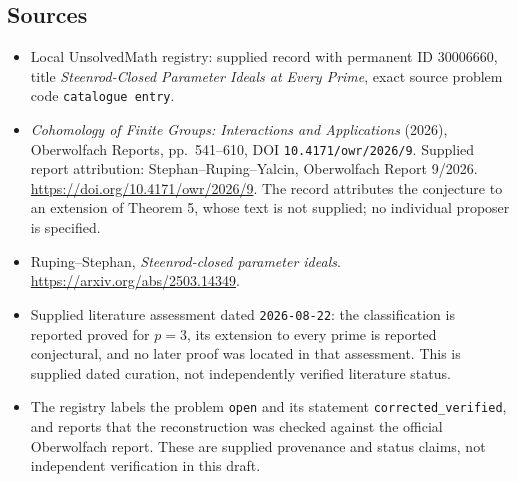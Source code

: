 \documentclass[11pt]{article}
\begin{document}
\subsection{Sources}
\begin{itemize}
\item Local UnsolvedMath registry: supplied record with permanent ID \(30006660\), title \emph{Steenrod-Closed Parameter Ideals at Every Prime}, exact source problem code \texttt{catalogue entry}.
\item \emph{Cohomology of Finite Groups: Interactions and Applications} (2026), Oberwolfach Reports, pp.~541--610, DOI \texttt{10.4171/owr/2026/9}. Supplied report attribution: Stephan--Ruping--Yalcin, Oberwolfach Report 9/2026. \url{https://doi.org/10.4171/owr/2026/9}. The record attributes the conjecture to an extension of Theorem 5, whose text is not supplied; no individual proposer is specified.
\item Ruping--Stephan, \emph{Steenrod-closed parameter ideals}. \url{https://arxiv.org/abs/2503.14349}.
\item Supplied literature assessment dated \texttt{2026-08-22}: the classification is reported proved for \(p=3\), its extension to every prime is reported conjectural, and no later proof was located in that assessment. This is supplied dated curation, not independently verified literature status.
\item The registry labels the problem \texttt{open} and its statement \texttt{corrected\_verified}, and reports that the reconstruction was checked against the official Oberwolfach report. These are supplied provenance and status claims, not independent verification in this draft.
\end{itemize}
\end{document}
